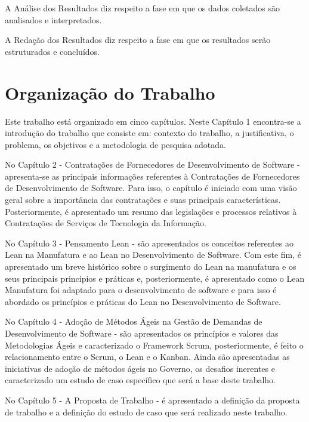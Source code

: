 A Análise dos Resultados diz respeito a fase em que os dados coletados são analisados e interpretados.

A Redação dos Resultados diz respeito a fase em que os resultados serão estruturados e concluídos.

\section[Organização do Trabalho]{Organização do Trabalho}

Este trabalho está organizado em cinco capítulos. Neste Capítulo 1 encontra-se a introdução do trabalho que consiste em: contexto do trabalho, a justificativa,  o problema, os objetivos e a metodologia de pesquisa adotada.

No Capítulo 2 - Contratações de Fornecedores de Desenvolvimento de Software - apresenta-se as principais informações referentes à Contratações de Fornecedores de Desenvolvimento de Software. Para isso, o capítulo é iniciado com uma visão geral sobre a importância das contratações e suas principais características. Posteriormente, é apresentado um resumo das legislações e processos relativos à Contratações de Serviços de Tecnologia da Informação.

No Capítulo 3 - Pensamento Lean - são apresentados os conceitos referentes ao Lean na Manufatura e ao Lean no Desenvolvimento de Software. Com este fim, é apresentado um breve histórico sobre o surgimento do Lean na manufatura e os seus principais princípios e práticas e, posteriormente, é apresentado como o Lean Manufatura foi adaptado para o desenvolvimento de software e para isso é abordado os princípios e práticas do Lean no Desenvolvimento de Software.

No Capítulo 4  - Adoção de Métodos Ágeis na Gestão de Demandas de Desenvolvimento de Software - são apresentados os princípios e valores das Metodologias Ágeis e caracterizado o Framework Scrum, posteriormente, é feito o relacionamento entre o Scrum, o Lean e o Kanban. Ainda são apresentadas as iniciativas de adoção de métodos ágeis no Governo, os desafios inerentes e caracterizado um estudo de caso específico que será a base deste trabalho.

No Capítulo 5 - A Proposta de Trabalho - é apresentado a definição da proposta de trabalho e a definição do estudo de caso que será realizado neste trabalho.